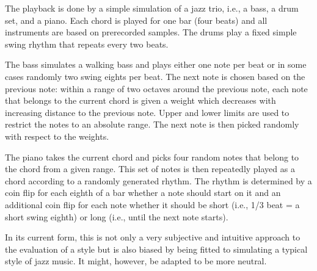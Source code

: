 The playback is done by a simple simulation of a jazz trio, i.e., a bass, a drum set, and a piano.
Each chord is played for one bar (four beats) and all instruments are based on prerecorded samples. The drums play a fixed simple swing rhythm that repeats every two beats.

The bass simulates a walking bass and plays either one note per beat or in some cases randomly two swing eights per beat.
The next note is chosen based on the previous note: within a range of two octaves around the previous note, each note that belongs to the current chord is given a weight which decreases with increasing distance to the previous note.
Upper and lower limits are used to restrict the notes to an absolute range.
The next note is then picked randomly with respect to the weights.

The piano takes the current chord and picks four random notes that belong to the chord from a given range.
This set of notes is then repeatedly played as a chord according to a randomly generated rhythm.
The rhythm is determined by a coin flip for each eighth of a bar whether a note should start on it and an additional coin flip for each note whether it should be short (i.e., 1/3 beat = a short swing eighth) or long (i.e., until the next note starts).

In its current form, this is not only a very subjective and intuitive approach to the evaluation of a style but is also biased by being fitted to simulating a typical style of jazz music.
It might, however, be adapted to be more neutral.